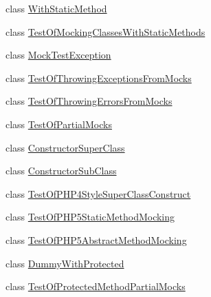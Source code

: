 \begin{DoxyCompactItemize}
class \hyperlink{class_with_static_method}{With\-Static\-Method}
\item 
class \hyperlink{class_test_of_mocking_classes_with_static_methods}{Test\-Of\-Mocking\-Classes\-With\-Static\-Methods}
\item 
class \hyperlink{class_mock_test_exception}{Mock\-Test\-Exception}
\item 
class \hyperlink{class_test_of_throwing_exceptions_from_mocks}{Test\-Of\-Throwing\-Exceptions\-From\-Mocks}
\item 
class \hyperlink{class_test_of_throwing_errors_from_mocks}{Test\-Of\-Throwing\-Errors\-From\-Mocks}
\item 
class \hyperlink{class_test_of_partial_mocks}{Test\-Of\-Partial\-Mocks}
\item 
class \hyperlink{class_constructor_super_class}{Constructor\-Super\-Class}
\item 
class \hyperlink{class_constructor_sub_class}{Constructor\-Sub\-Class}
\item 
class \hyperlink{class_test_of_p_h_p4_style_super_class_construct}{Test\-Of\-P\-H\-P4\-Style\-Super\-Class\-Construct}
\item 
class \hyperlink{class_test_of_p_h_p5_static_method_mocking}{Test\-Of\-P\-H\-P5\-Static\-Method\-Mocking}
\item 
class \hyperlink{class_test_of_p_h_p5_abstract_method_mocking}{Test\-Of\-P\-H\-P5\-Abstract\-Method\-Mocking}
\item 
class \hyperlink{class_dummy_with_protected}{Dummy\-With\-Protected}
\item 
class \hyperlink{class_test_of_protected_method_partial_mocks}{Test\-Of\-Protected\-Method\-Partial\-Mocks}
\end{DoxyCompactItemize}
